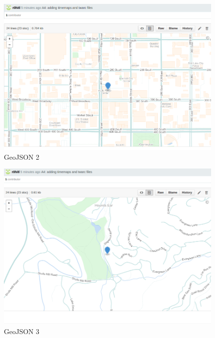 \begin{enumerate}
\newpage
\begin{figure}[ht]    
    \begin{center}
        \includegraphics[scale=0.40]{graphs/gj2.png}
        \caption{GeoJSON 2}
    \end{center}
\end{figure}

\newpage
\begin{figure}[ht]    
    \begin{center}
        \includegraphics[scale=0.40]{graphs/gj3.png}
        \caption{GeoJSON 3}
    \end{center}
\end{figure}


\end{enumerate}
